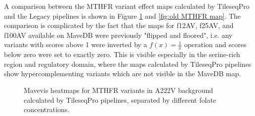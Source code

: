 \documentclass{article}
\begin{document}
A comparison between the MTHFR variant effect maps calculated by TileseqPro and the Legacy pipelines is shown in Figure \ref{fig:new MTHFR map} and \ref{fig:old MTHFR map}. The comparison is complicated by the fact that the maps for f12AV, f25AV, and f100AV available on MaveDB were previously "flipped and floored", i.e. any variants with scores above 1 were inverted by a $f(x)=\frac{1}{x}$ operation and scores below zero were set to exactly zero. This is visible especially in the serine-rich region and regulatory domain, where the maps calculated by TileseqPro pipelines show hypercomplementing variants which are not visible in the MaveDB map.


\begin{figure}[H]%
    \centering
    \qquad
    \qquad
    \qquad
    \caption{Mavevis heatmaps for MTHFR variants in A222V background calculated by TileseqPro pipelines, separated by different folate concentrations.}%
    \label{fig:new MTHFR map}%
\end{figure}
\end{document}
